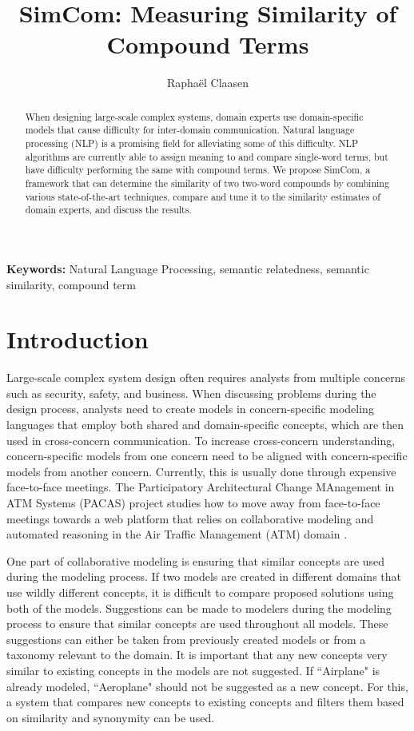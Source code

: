\documentclass{article}
\title{SimCom: Measuring Similarity of Compound Terms}
\author{Rapha\"el Claasen}
\begin{document}
\maketitle

\begin{abstract}
When designing large-scale complex systems, domain experts use domain-specific models that cause difficulty for inter-domain communication. Natural language processing (NLP) is a promising field for alleviating some of this difficulty. NLP algorithms are currently able to assign meaning to and compare single-word terms, but have difficulty performing the same with compound terms. We propose SimCom, a framework that can determine the similarity of two two-word compounds by combining various state-of-the-art techniques, compare and tune it to the similarity estimates of domain experts, and discuss the results.
\end{abstract}

{\bf Keywords:} Natural Language Processing, semantic relatedness, semantic similarity, compound term

\section{Introduction} \label{sec:introduction}

Large-scale complex system design often requires analysts from multiple concerns such as security, safety, and business. When discussing problems during the design process, analysts need to create models in concern-specific modeling languages that employ both shared and domain-specific concepts, which are then used in cross-concern communication. To increase cross-concern understanding, concern-specific models from one concern need to be aligned with concern-specific models from another concern. Currently, this is usually done through expensive face-to-face meetings. The Participatory Architectural Change MAnagement in ATM Systems (PACAS) project studies how to move away from face-to-face meetings towards a web platform that relies on collaborative modeling and automated reasoning in the Air Traffic Management (ATM) domain \cite{aydemir2017towards}.

One part of collaborative modeling is ensuring that similar concepts are used during the modeling process. If two models are created in different domains that use wildly different concepts, it is difficult to compare proposed solutions using both of the models. Suggestions can be made to modelers during the modeling process to ensure that similar concepts are used throughout all models. These suggestions can either be taken from previously created models or from a taxonomy relevant to the domain. It is important that any new concepts very similar to existing concepts in the models are not suggested. If ``Airplane" is already modeled, ``Aeroplane" should not be suggested as a new concept. For this, a system that compares new concepts to existing concepts and filters them based on similarity and synonymity can be used.
\end{document}
